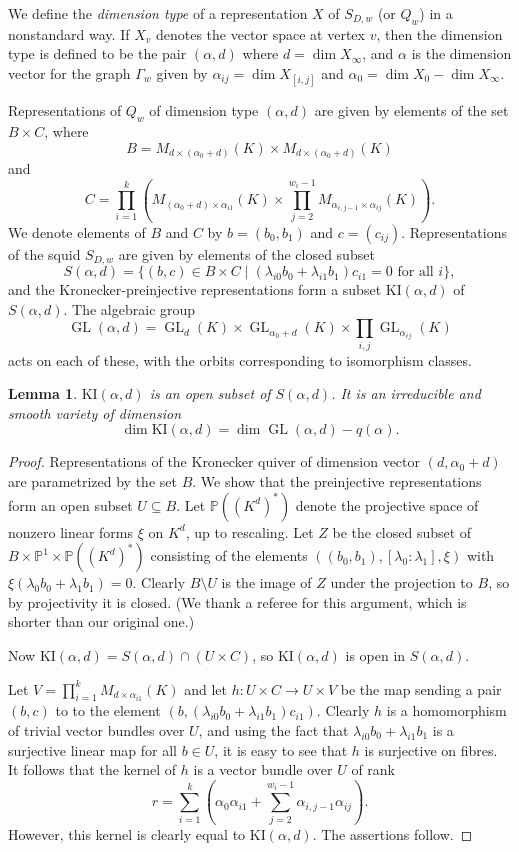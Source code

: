 \documentclass{amsart}
\theoremstyle{plain}
\newtheorem{lem}[thm]{Lemma}
\theoremstyle{definition}
\theoremstyle{remark}
\newcommand{\PP}{\mathbb{P}}
\DeclareMathOperator{\GL}{GL}
\begin{document}
We define the \emph{dimension type} of a representation $X$ of $S_{D,w}$ (or $Q_w$) in a nonstandard way.
If $X_v$ denotes the vector space at vertex $v$, then the dimension type is defined to be the
pair $(\alpha,d)$ where $d = \dim X_\infty$, and $\alpha$ is the dimension vector
for the graph $\Gamma_w$ given by $\alpha_{ij} = \dim X_{[i,j]}$ and $\alpha_0 = \dim X_0 - \dim X_\infty$.

Representations of $Q_w$ of dimension type $(\alpha,d)$ are given by elements
of the set $B \times C$, where
\[
B = M_{d\times(\alpha_0+d)}(K) \times M_{d\times(\alpha_0+d)}(K)
\]
and
\[
C = \prod_{i=1}^k
\left( M_{(\alpha_0+d)\times\alpha_{i1}}(K) \times \prod_{j=2}^{w_i-1} M_{\alpha_{i,j-1}\times\alpha_{ij}}(K) \right).
\]
We denote elements of $B$ and $C$ by $b=(b_0,b_1)$ and $c = (c_{ij})$.
Representations of the squid $S_{D,w}$ are given by elements of the closed subset
\[
S(\alpha,d) = \{ (b,c)\in B\times C \mid \text{$(\lambda_{i0} b_0 + \lambda_{i1} b_1)c_{i1}=0$ for all $i$}\},
\]
and the Kronecker-preinjective representations form a subset $\mathrm{KI}(\alpha,d)$ of $S(\alpha,d)$.
The algebraic group
\[
\GL(\alpha,d) = \GL_d(K) \times \GL_{\alpha_0+d}(K) \times \prod_{i,j} \GL_{\alpha_{ij}}(K)
\]
acts on each of these, with the orbits corresponding to isomorphism classes.


\begin{lem}\label{l:KPirred}
$\mathrm{KI}(\alpha,d)$ is an open subset of $S(\alpha,d)$. It is
an irreducible and smooth variety of dimension
\[
\dim \mathrm{KI}(\alpha,d) = \dim \GL(\alpha,d) - q(\alpha).
\]
\end{lem}


\begin{proof}
Representations of the Kronecker quiver of dimension vector $(d,\alpha_0+d)$
are parametrized by the set $B$.
We show that the preinjective representations form an open subset $U\subseteq B$.
Let $\PP((K^d)^*)$ denote the projective space of nonzero linear forms $\xi$ on $K^d$,
up to rescaling. Let $Z$ be the closed subset of $B\times\PP^1\times \PP((K^d)^*)$
consisting of the elements $((b_0,b_1),[\lambda_0:\lambda_1],\xi)$
with $\xi(\lambda_0 b_0+\lambda_1 b_1)=0$. Clearly $B\setminus U$ is the
image of $Z$ under the projection to $B$, so by projectivity it is closed.
(We thank a referee for this argument, which is shorter than our original one.)

Now $\mathrm{KI}(\alpha,d) = S(\alpha,d) \cap (U\times C)$,
so $\mathrm{KI}(\alpha,d)$ is open in $S(\alpha,d)$.

Let $V = \prod_{i=1}^k M_{d\times \alpha_{i1}}(K)$ and let $h:U\times C\to U\times V$
be the map sending a pair $(b,c)$ to to the element $(b,(\lambda_{i0} b_0 + \lambda_{i1} b_1)c_{i1})$.
Clearly $h$ is a homomorphism of trivial vector bundles over $U$, and
using the fact that $\lambda_{i0} b_0 + \lambda_{i1} b_1$ is a surjective
linear map for all $b\in U$, it is easy to see that
$h$ is surjective on fibres.
It follows that the kernel of $h$ is a vector bundle over $U$ of rank
\[
r = \sum_{i=1}^k \left( \alpha_0\alpha_{i1} + \sum_{j=2}^{w_i-1} \alpha_{i,j-1}\alpha_{ij} \right).
\]
However, this kernel is clearly equal to $\mathrm{KI}(\alpha,d)$. The assertions follow.
\end{proof}
\end{document}
